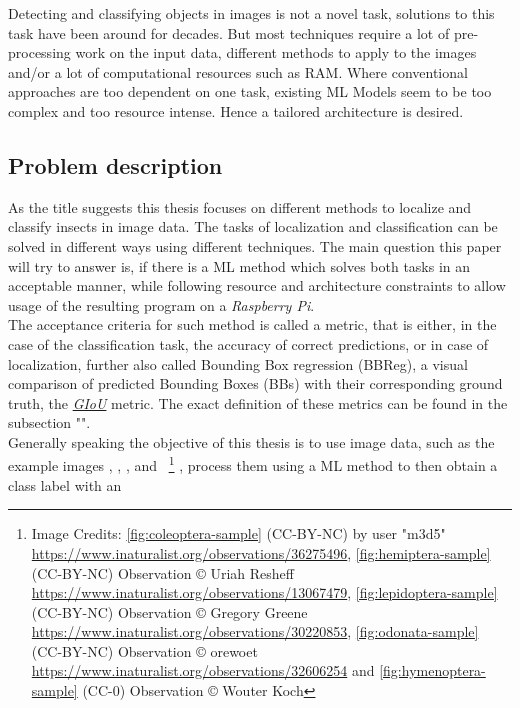 Detecting and classifying objects in images is not a novel task, solutions to this task have been around for decades.
But most techniques require a lot of pre-processing work on the input data, different methods to apply to the images and/or a lot of computational resources such as RAM.
Where conventional approaches are too dependent on one task, existing ML Models seem to be too complex and too resource intense. Hence a tailored architecture is desired.

\subsection{Problem description}\label{subsec:problem-description}
As the title suggests this thesis focuses on different methods to localize and classify insects in image data.
The tasks of localization and classification can be solved in different ways using different techniques.
The main question this paper will try to answer is, if there is a ML method which solves both tasks in an acceptable manner, while following resource and architecture constraints to allow usage of the resulting program on a \textit{Raspberry Pi}.\\
The acceptance criteria for such method is called a metric, that is either, in the case of the classification task, the accuracy of correct predictions, or in case of localization, further also called Bounding Box regression (BBReg), a visual comparison of predicted Bounding Boxes (BBs) with their corresponding ground truth, the \hyperref[eq:giou]{\textit{GIoU}} metric. The exact definition of these metrics can be found in the subsection "".\\
Generally speaking the objective of this thesis is to use image data, such as the example images
, , ,  and 
~\footnote{Image Credits:
\ref{fig:coleoptera-sample} (CC-BY-NC) by user "m3d5" \url{https://www.inaturalist.org/observations/36275496},
\ref{fig:hemiptera-sample} (CC-BY-NC) Observation © Uriah Resheff  \url{https://www.inaturalist.org/observations/13067479},
\ref{fig:lepidoptera-sample}(CC-BY-NC) Observation © Gregory Greene \url{https://www.inaturalist.org/observations/30220853},
\ref{fig:odonata-sample} (CC-BY-NC) Observation © orewoet \url{https://www.inaturalist.org/observations/32606254} and
\ref{fig:hymenoptera-sample} (CC-0) Observation © Wouter Koch}
, process them using a ML method to then obtain a class label with an
